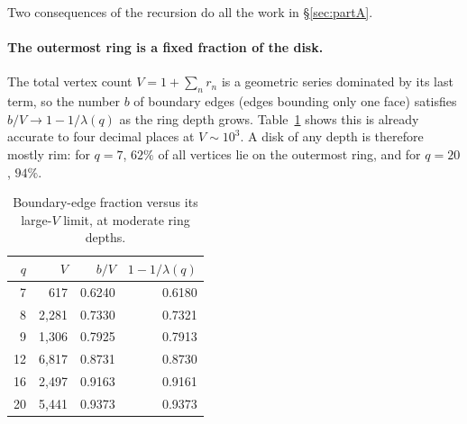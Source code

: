 \documentclass[11pt]{article}
\begin{document}
Two consequences of the recursion do all the work in \S\ref{sec:partA}.

\paragraph{The outermost ring is a fixed fraction of the disk.} The total vertex count $V=1+\sum_n r_n$ is a geometric series dominated by its last term, so the number $b$ of boundary edges (edges bounding only one face) satisfies $b/V\to1-1/\lambda(q)$ as the ring depth grows. Table~\ref{tab:boundary} shows this is already accurate to four decimal places at $V\sim10^3$. A disk of any depth is therefore mostly rim: for $q=7$, $62\%$ of all vertices lie on the outermost ring, and for $q=20$, $94\%$.

\begin{table}[htbp]
\centering
\begin{tabular}{rrrr}
\toprule
$q$ & $V$ & $b/V$ & $1-1/\lambda(q)$ \\
\midrule
7  & 617     & 0.6240 & 0.6180 \\
8  & 2{,}281 & 0.7330 & 0.7321 \\
9  & 1{,}306 & 0.7925 & 0.7913 \\
12 & 6{,}817 & 0.8731 & 0.8730 \\
16 & 2{,}497 & 0.9163 & 0.9161 \\
20 & 5{,}441 & 0.9373 & 0.9373 \\
\bottomrule
\end{tabular}
\caption{Boundary-edge fraction versus its large-$V$ limit, at moderate ring depths.}
\label{tab:boundary}
\end{table}
\end{document}
